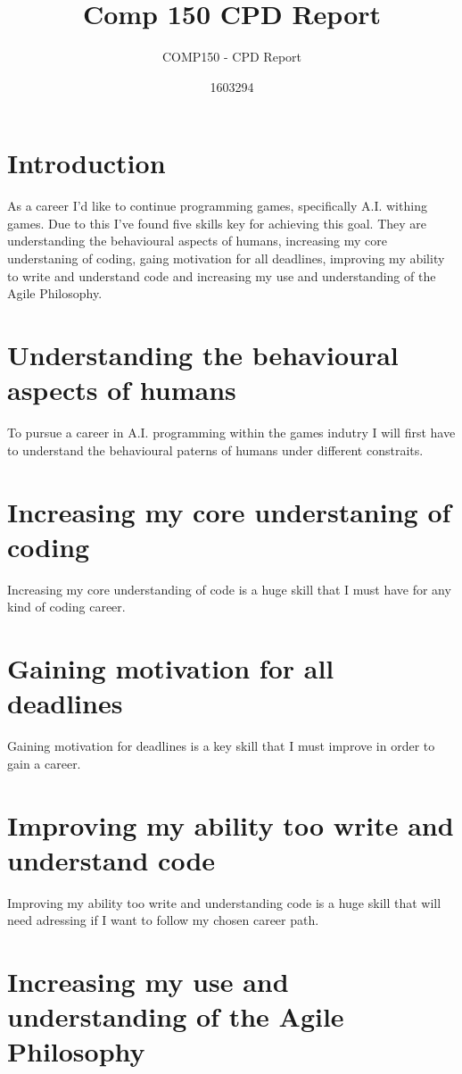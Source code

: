 \documentclass{scrartcl}
\title{Comp 150 CPD Report}
\subtitle{COMP150 - CPD Report}
\author{1603294}
\begin{document}
\maketitle

\section{Introduction}

As a career I'd like to continue programming games, specifically A.I. withing games. Due to this I've found five skills key for achieving this goal. They are understanding the behavioural aspects of humans, increasing my core understaning of coding, gaing motivation for all deadlines, improving my ability to write and understand code and increasing my use and understanding of the Agile Philosophy.

\section{Understanding the behavioural aspects of humans}

To pursue a career in A.I. programming within the games indutry I will first have to understand the behavioural paterns of humans under different constraits.

\section{Increasing my core understaning of coding}

Increasing my core understanding of code is a huge skill that I must have for any kind of coding career.

\section{Gaining motivation for all deadlines}

Gaining motivation for deadlines is a key skill that I must improve in order to gain a career.

\section{Improving my ability too write and understand code}

Improving my ability too write and understanding code is a huge skill that will need adressing if I want to follow my chosen career path.

\section{Increasing my use and understanding of the Agile Philosophy}
\end{document}
